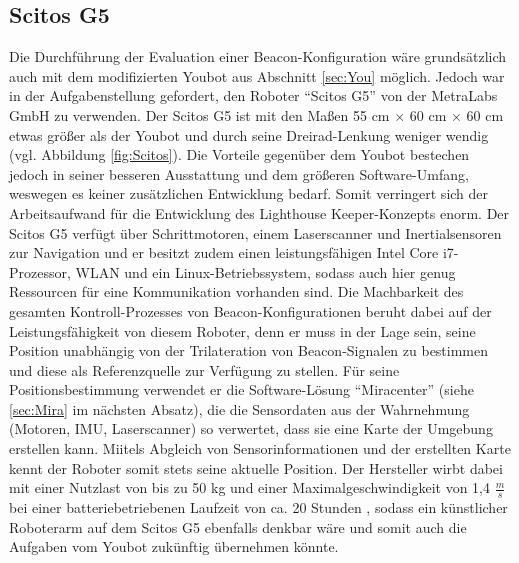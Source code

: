\subsection{Scitos G5}
Die Durchführung der Evaluation einer Beacon-Konfiguration wäre grundsätzlich auch mit dem modifizierten Youbot aus Abschnitt \ref{sec:You} möglich. Jedoch war in der Aufgabenstellung gefordert, den Roboter "`Scitos G5"' von der MetraLabs GmbH zu verwenden. Der Scitos G5 ist mit den Maßen 55 cm $\times$ 60 cm $\times$ 60 cm etwas größer als der Youbot und durch seine Dreirad-Lenkung weniger wendig (vgl. Abbildung \ref{fig:Scitos}). Die Vorteile gegenüber dem Youbot bestechen jedoch in seiner besseren Ausstattung und dem größeren Software-Umfang, weswegen es keiner zusätzlichen Entwicklung bedarf. Somit verringert sich der Arbeitsaufwand für die Entwicklung des Lighthouse Keeper-Konzepts enorm. Der Scitos G5 verfügt über Schrittmotoren, einem Laserscanner und Inertialsensoren zur Navigation und er besitzt zudem einen leistungsfähigen Intel Core i7-Prozessor, WLAN und ein Linux-Betriebssystem, sodass auch hier genug Ressourcen für eine Kommunikation vorhanden sind. Die Machbarkeit des gesamten Kontroll-Prozesses von Beacon-Konfigurationen beruht dabei auf der Leistungsfähigkeit von diesem Roboter, denn er muss in der Lage sein, seine Position unabhängig von der Trilateration von Beacon-Signalen zu bestimmen und diese als Referenzquelle zur Verfügung zu stellen. Für seine Positionsbestimmung verwendet er die Software-Lösung "`Miracenter"' (siehe \ref{sec:Mira} im nächsten Absatz), die die Sensordaten aus der Wahrnehmung (Motoren, IMU, Laserscanner) so verwertet, dass sie eine Karte der Umgebung erstellen kann. Miitels Abgleich von Sensorinformationen und der erstellten Karte kennt der Roboter somit stets seine aktuelle Position. Der Hersteller wirbt dabei mit einer Nutzlast von bis zu 50 kg und einer Maximalgeschwindigkeit von 1,4 $\frac{m}{s}$ bei einer batteriebetriebenen Laufzeit von ca. 20 Stunden \cite{Mira}, sodass ein künstlicher Roboterarm auf dem Scitos G5 ebenfalls denkbar wäre und somit auch die Aufgaben vom Youbot zukünftig übernehmen könnte.
